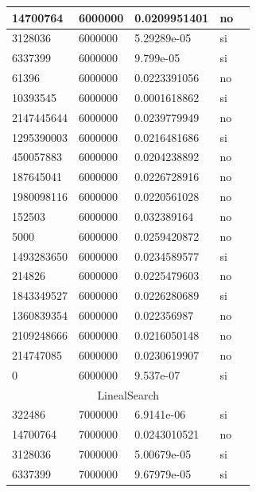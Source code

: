 \documentclass[12pt, fleqn]{article}                             %
\theoremstyle{break}                                            %
\begin{document}
\begin{longtable}{|m{5em}|m{5em}|m{10em}|m{5em}|@{}m{0pt}@{}}
            14700764& 6000000  & 0.0209951401 & no &\\[1em]    \hline
            3128036& 6000000  & 5.29289e-05 & si &\\[1em]    \hline
            6337399& 6000000  & 9.799e-05 & si &\\[1em]    \hline
            61396& 6000000  & 0.0223391056 & no &\\[1em]    \hline
            10393545& 6000000  & 0.0001618862 & si &\\[1em]    \hline
            2147445644& 6000000  & 0.0239779949 & no &\\[1em]    \hline
            1295390003& 6000000  & 0.0216481686 & si &\\[1em]    \hline
            450057883& 6000000  & 0.0204238892 & no &\\[1em]    \hline
            187645041& 6000000  & 0.0226728916 & no &\\[1em]    \hline
            1980098116& 6000000  & 0.0220561028 & no &\\[1em]    \hline
            152503& 6000000  & 0.032389164 & no &\\[1em]    \hline
            5000& 6000000  & 0.0259420872 & no &\\[1em]    \hline
            1493283650& 6000000  & 0.0234589577 & si &\\[1em]    \hline
            214826& 6000000  & 0.0225479603 & no &\\[1em]    \hline
            1843349527& 6000000  & 0.0226280689 & si &\\[1em]    \hline
            1360839354& 6000000  & 0.022356987 & no &\\[1em]    \hline
            2109248666& 6000000  & 0.0216050148 & no &\\[1em]    \hline
            214747085& 6000000  & 0.0230619907 & no &\\[1em]    \hline
            0& 6000000  & 9.537e-07 & si &\\[1em]    \hline
            \multicolumn{5}{|c|}{LinealSearch}   \\          \hline
            322486& 7000000  & 6.9141e-06 & si &\\[1em]    \hline
            14700764& 7000000  & 0.0243010521 & no &\\[1em]    \hline
            3128036& 7000000  & 5.00679e-05 & si &\\[1em]    \hline
            6337399& 7000000  & 9.67979e-05 & si &\\[1em]    \hline

\end{longtable}
\end{document}
